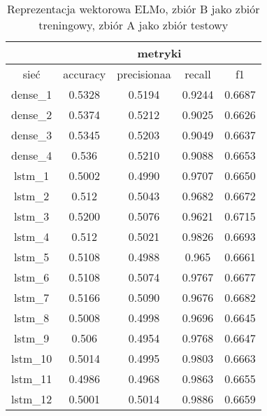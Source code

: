 \begin{table}[] \centering
    \caption{Reprezentacja wektorowa ELMo, zbiór B jako zbiór treningowy, zbiór A jako zbiór testowy }
    \label{tab:wyniki_1024_eks2}
    \begin{tabular}{|c|c|c|c|c|}
        \hline
                 & \multicolumn{4}{c|}{metryki}                                 \\ \hline
        sieć     & accuracy                     & precisionaa & recall & f1     \\ \hline
        dense\_1 & 0.5328                       & 0.5194      & 0.9244 & 0.6687 \\ \hline
        dense\_2 & 0.5374                       & 0.5212      & 0.9025 & 0.6626 \\ \hline
        dense\_3 & 0.5345                       & 0.5203      & 0.9049 & 0.6637 \\ \hline
        dense\_4 & 0.536                        & 0.5210      & 0.9088 & 0.6653 \\ \hline
        lstm\_1  & 0.5002                       & 0.4990      & 0.9707 & 0.6650 \\ \hline
        lstm\_2  & 0.512                        & 0.5043      & 0.9682 & 0.6672 \\ \hline
        lstm\_3  & 0.5200                       & 0.5076      & 0.9621 & 0.6715 \\ \hline
        lstm\_4  & 0.512                        & 0.5021      & 0.9826 & 0.6693 \\ \hline
        lstm\_5  & 0.5108                       & 0.4988      & 0.965  & 0.6661 \\ \hline
        lstm\_6  & 0.5108                       & 0.5074      & 0.9767 & 0.6677 \\ \hline
        lstm\_7  & 0.5166                       & 0.5090      & 0.9676 & 0.6682 \\ \hline
        lstm\_8  & 0.5008                       & 0.4998      & 0.9696 & 0.6645 \\ \hline
        lstm\_9  & 0.506                        & 0.4954      & 0.9768 & 0.6647 \\ \hline
        lstm\_10 & 0.5014                       & 0.4995      & 0.9803 & 0.6663 \\ \hline
        lstm\_11 & 0.4986                       & 0.4968      & 0.9863 & 0.6655 \\ \hline
        lstm\_12 & 0.5001                       & 0.5014      & 0.9886 & 0.6659 \\ \hline

\end{tabular}
\end{table}
